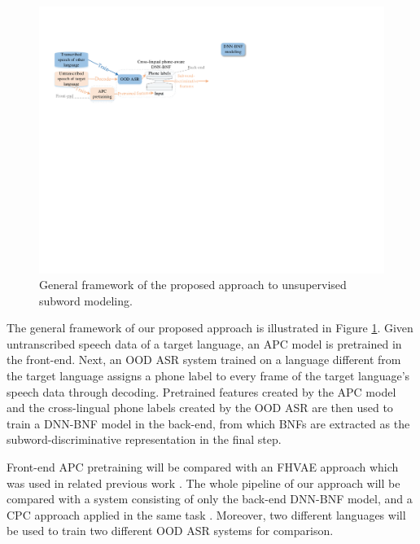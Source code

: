 \documentclass[a4paper]{article}
\begin{document}
\begin{figure}
    \centering
    \includegraphics[width=\linewidth]{LaTeX/apc_framework_detail_other_lang.pdf}
    \caption{General framework of the proposed approach to unsupervised subword modeling.  }
    \label{fig:general_framework}
\end{figure}
The general framework of our proposed approach is illustrated in Figure \ref{fig:general_framework}. Given untranscribed speech data of a  target  language, an APC  model is pretrained in the front-end.
Next, an OOD ASR system trained on a language different from the target language  assigns a phone label to every frame of the target language's speech data through decoding. Pretrained features  created by the APC model and the cross-lingual phone labels created by the OOD ASR are then used to train a DNN-BNF model in the back-end, from which BNFs are extracted as the subword-discriminative representation in the final step.

Front-end APC pretraining will be compared with an FHVAE approach \cite{hsu2017nips} which was used in related previous work \cite{Feng2019improving}. The whole pipeline of our approach will be compared with a system consisting of only the back-end DNN-BNF model, and a CPC approach \cite{oord2018cpc} applied in the same task \cite{kahn2019librilight}.
Moreover, two different languages will be used to train two different OOD ASR systems for comparison.
\end{document}
